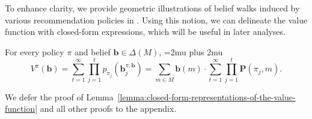 To enhance clarity, we provide geometric illustrations of belief walks induced by various recommendation policies in . Using this notion, we can delineate the value function with closed-form expressions, which will be useful in later analyses. 
\begin{lemma}\label{lemma:closed-form-representations-of-the-value-function}
    For every policy $\pi$ and belief $\bm{b} \in \Delta(M)$,
    {
    \thickmuskip=2mu plus 2mu
    \[
        V^\pi(\bm{b}) = \sum_{t=1}^{\infty} \prod_{j=1}^{t} p_{\pi_j}(\bm{b}^{\pi, \bm{b}}_j) = \sum_{m \in M} \bm{b}(m) \cdot \sum_{t=1}^{\infty} \prod_{j=1}^{t} \bm{P}(\pi_j, m).
    \]
    }%
\end{lemma}
We defer the proof of Lemma~\ref{lemma:closed-form-representations-of-the-value-function} and all other proofs to the appendix.




